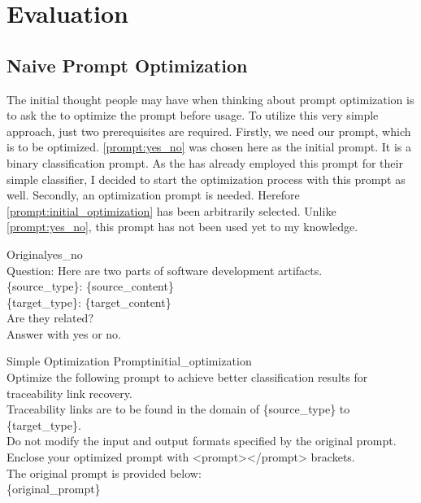 \usepackage{hyperref}%

\chapter{Evaluation}
\label{ch:Evaluation}


\section{Naive Prompt Optimization}
\label{sec:Evaluation:naive_optimization}

The initial thought people may have when thinking about prompt optimization is to ask the \LLM to optimize the prompt before usage. To utilize this very simple approach, just two prerequisites are required. Firstly, we need our prompt, which is to be optimized. \autoref{prompt:yes_no} was chosen here as the initial prompt. It is a \KISS binary classification prompt. As the \LiSSAf has already employed this prompt for their simple classifier, I decided to start the optimization process with this prompt as well. Secondly, an optimization prompt is needed. Herefore \autoref{prompt:initial_optimization} has been arbitrarily selected. Unlike \autoref{prompt:yes_no}, this prompt has not been used yet to my knowledge. %

\begin{prompt}{\KISS Original}{yes_no}\\
    Question: Here are two parts of software development artifacts.\\
    \{source\_type\}: \tripplequote \{source\_content\}\tripplequote\\
    \{target\_type\}: \tripplequote\{target\_content\}\tripplequote\\
    Are they related?\\
    Answer with \textquotesingle{}yes\textquotesingle{} or \textquotesingle{}no\textquotesingle{}.
\end{prompt}

\begin{prompt}{Simple Optimization Prompt}{initial_optimization}\\
    Optimize the following prompt to achieve better classification results for traceability link recovery. \\
    Traceability links are to be found in the domain of \{source\_type\} to \{target\_type\}. \\
    Do not modify the input and output formats specified by the original prompt.\\
    Enclose your optimized prompt with <prompt></prompt> brackets.\\
    The original prompt is provided below:\\
    \tripplequote\{original\_prompt\}\tripplequote
\end{prompt}

